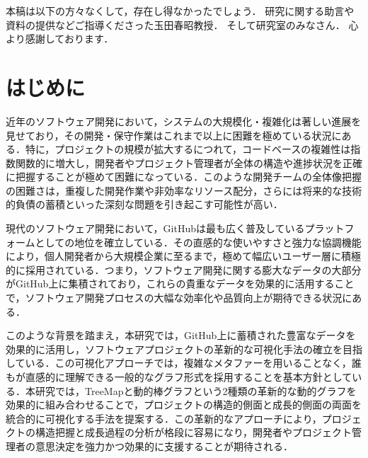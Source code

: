 \documentclass[12pt,twoside]{jbook}
\begin{document}
\begin{acknowledgments}
  本稿は以下の方々なくして，存在し得なかったでしょう．
  研究に関する助言や資料の提供などご指導くださった玉田春昭教授．
  そして研究室のみなさん．
  心より感謝しております．


\end{acknowledgments}


\tableofcontents       %

%
%

\listoffigures         %
\listoftables          %


%
%
\chapter{はじめに}
近年のソフトウェア開発において，システムの大規模化・複雑化は著しい進展を見せており，その開発・保守作業はこれまで以上に困難を極めている状況にある．特に，プロジェクトの規模が拡大するにつれて，コードベースの複雑性は指数関数的に増大し，開発者やプロジェクト管理者が全体の構造や進捗状況を正確に把握することが極めて困難になっている．このような開発チームの全体像把握の困難さは，重複した開発作業や非効率なリソース配分，さらには将来的な技術的負債の蓄積といった深刻な問題を引き起こす可能性が高い．

現代のソフトウェア開発において，GitHubは最も広く普及しているプラットフォームとしての地位を確立している．その直感的な使いやすさと強力な協調機能により，個人開発者から大規模企業に至るまで，極めて幅広いユーザー層に積極的に採用されている．つまり，ソフトウェア開発に関する膨大なデータの大部分がGitHub上に集積されており，これらの貴重なデータを効果的に活用することで，ソフトウェア開発プロセスの大幅な効率化や品質向上が期待できる状況にある．

このような背景を踏まえ，本研究では，GitHub上に蓄積された豊富なデータを効果的に活用し，ソフトウェアプロジェクトの革新的な可視化手法の確立を目指している．この可視化アプローチでは，複雑なメタファーを用いることなく，誰もが直感的に理解できる一般的なグラフ形式を採用することを基本方針としている．本研究では，TreeMapと動的棒グラフという2種類の革新的な動的グラフを効果的に組み合わせることで，プロジェクトの構造的側面と成長的側面の両面を統合的に可視化する手法を提案する．この革新的なアプローチにより，プロジェクトの構造把握と成長過程の分析が格段に容易になり，開発者やプロジェクト管理者の意思決定を強力かつ効果的に支援することが期待される．
\end{document}
